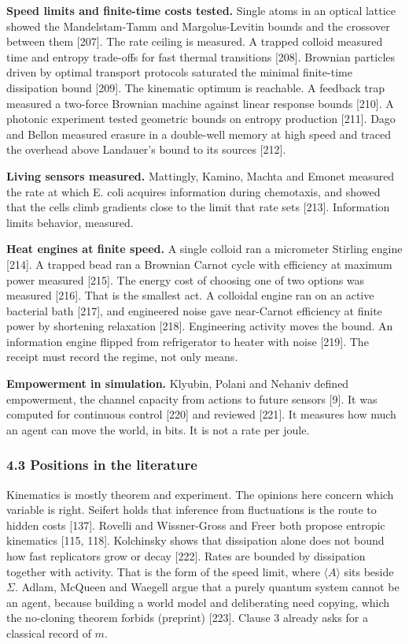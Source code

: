 \documentclass[
  10pt,
]{article}
\begin{document}
\textbf{Speed limits and finite-time costs tested.} Single atoms in an
optical lattice showed the Mandelstam-Tamm and Margolus-Levitin bounds
and the crossover between them {[}207{]}. The rate ceiling is measured.
A trapped colloid measured time and entropy trade-offs for fast thermal
transitions {[}208{]}. Brownian particles driven by optimal transport
protocols saturated the minimal finite-time dissipation bound {[}209{]}.
The kinematic optimum is reachable. A feedback trap measured a two-force
Brownian machine against linear response bounds {[}210{]}. A photonic
experiment tested geometric bounds on entropy production {[}211{]}. Dago
and Bellon measured erasure in a double-well memory at high speed and
traced the overhead above Landauer's bound to its sources {[}212{]}.

\textbf{Living sensors measured.} Mattingly, Kamino, Machta and Emonet
measured the rate at which E. coli acquires information during
chemotaxis, and showed that the cells climb gradients close to the limit
that rate sets {[}213{]}. Information limits behavior, measured.

\textbf{Heat engines at finite speed.} A single colloid ran a micrometer
Stirling engine {[}214{]}. A trapped bead ran a Brownian Carnot cycle
with efficiency at maximum power measured {[}215{]}. The energy cost of
choosing one of two options was measured {[}216{]}. That is the smallest
act. A colloidal engine ran on an active bacterial bath {[}217{]}, and
engineered noise gave near-Carnot efficiency at finite power by
shortening relaxation {[}218{]}. Engineering activity moves the bound.
An information engine flipped from refrigerator to heater with noise
{[}219{]}. The receipt must record the regime, not only means.

\textbf{Empowerment in simulation.} Klyubin, Polani and Nehaniv defined
empowerment, the channel capacity from actions to future sensors
{[}9{]}. It was computed for continuous control {[}220{]} and reviewed
{[}221{]}. It measures how much an agent can move the world, in bits. It
is not a rate per joule.

\subsubsection{4.3 Positions in the
literature}\label{positions-in-the-literature-1}

Kinematics is mostly theorem and experiment. The opinions here concern
which variable is right. Seifert holds that inference from fluctuations
is the route to hidden costs {[}137{]}. Rovelli and Wissner-Gross and
Freer both propose entropic kinematics {[}115, 118{]}. Kolchinsky shows
that dissipation alone does not bound how fast replicators grow or decay
{[}222{]}. Rates are bounded by dissipation together with activity. That
is the form of the speed limit, where \(\langle A\rangle\) sits beside
\(\Sigma\). Adlam, McQueen and Waegell argue that a purely quantum
system cannot be an agent, because building a world model and
deliberating need copying, which the no-cloning theorem forbids
(preprint) {[}223{]}. Clause 3 already asks for a classical record of
\(m\).
\end{document}
